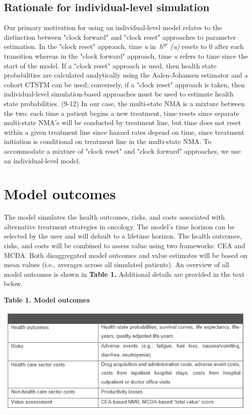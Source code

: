 \documentclass[11pt,final,fleqn]{article}\usepackage[]{graphicx}\usepackage[]{color}
\theoremstyle{plain}
\begin{document}
{\subsection{Rationale for individual-level simulation}

Our primary motivation for using an individual-level model relates to the distinction between "clock forward" and "clock reset" approaches to parameter estimation. In the "clock reset" approach, time \textit{u} in $\ h^{qr} $ \textit{(u)} resets to 0 after each transition whereas in the "clock forward" approach, time \textit{u} refers to time since the start of the model. If a "clock reset" approach is used, then health state probabilities are calculated analytically using the Aalen-Johansen estimator and a cohort CTSTM can be used; conversely, if a "clock reset" approach is taken, then individual-level simulation-based approaches must be used to estimate health state probabilities. (9-12) In our case, the multi-state NMA is a mixture between the two: each time a patient begins a new treatment, time resets since separate multi-state NMA's will be conducted by treatment line, but time does not reset within a given treatment line since hazard rates depend on time, since treatment initiation is conditional on treatment line in the multi-state NMA. To accommodate a mixture of "clock reset" and "clock forward" approaches, we use an individual-level model. 

\section{Model outcomes}\label{sec:model-outcomes}

The model simulates the health outcomes, risks, and costs associated with alternative treatment strategies in oncology. The model's time horizon can be selected by the user and will default to a lifetime horizon. The health outcomes, risks, and costs will be combined to assess value using two frameworks: CEA and MCDA. Both disaggregated model outcomes and value estimates will be based on mean values (i.e., averages across all simulated patients). An overview of all model outcomes is shown in \textbf{Table 1.} Additional details are provided in the text below.  

\textbf{Table 1. Model outcomes} 

\includegraphics[scale=1]{Table 1.PNG} 

}
\end{document}

